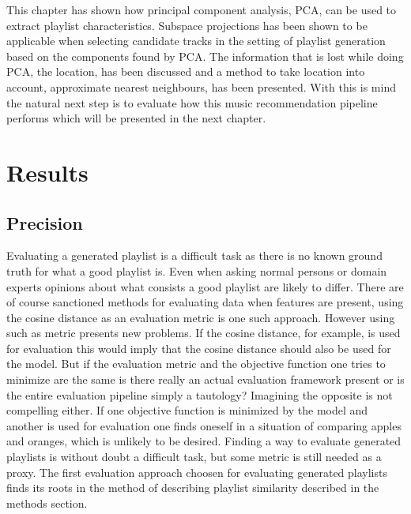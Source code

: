 \documentclass[a4paper,11pt]{kth-mag}
\begin{document}
This chapter has shown how principal component analysis, PCA, can be used to extract playlist characteristics. Subspace projections has been shown to be applicable when selecting candidate tracks in the setting of playlist generation based on the components found by PCA. The information that is lost while doing PCA, the location, has been discussed and a method to take location into account, approximate nearest neighbours, has been presented. With this is mind the natural next step is to evaluate how this music recommendation pipeline performs which will be presented in the next chapter.

\chapter{Results}
\section{Precision}
Evaluating a generated playlist is a difficult task as there is no known ground truth for what a good playlist is. Even when asking normal persons or domain experts opinions about what consists a good playlist are likely to differ. There are of course sanctioned methods for evaluating data when features are present, using the cosine distance as an evaluation metric is one such approach. However using such as metric presents new problems. If the cosine distance, for example, is used for evaluation this would imply that the cosine distance should also be used for the model. But if the evaluation metric and the objective function one tries to minimize are the same is there really an actual evaluation framework present or is the entire evaluation pipeline simply a tautology? Imagining the opposite is not compelling either. If one objective function is minimized by the model and another is used for evaluation one finds oneself in a situation of comparing apples and oranges, which is unlikely to be desired. Finding a way to evaluate generated playlists is without doubt a difficult task, but some metric is still needed as a proxy.
The first evaluation approach choosen for evaluating generated playlists finds its roots in the method of describing playlist similarity described in the methods section. 
\end{document}
